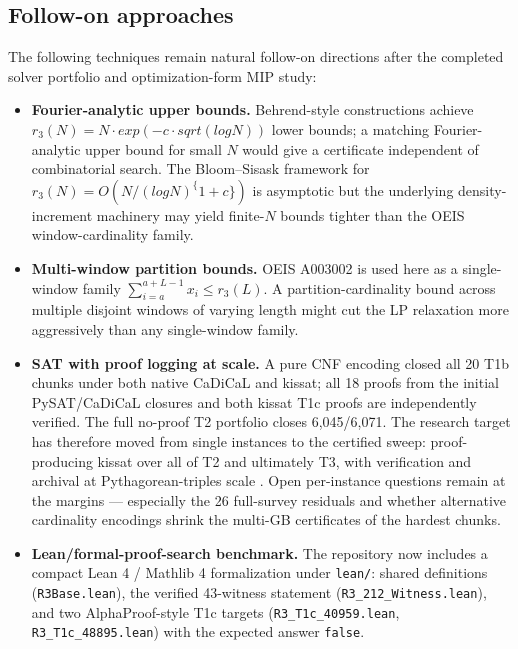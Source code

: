 \subsection{Follow-on approaches}\label{approaches-we-could-not-test}

The following techniques remain natural follow-on directions after the
completed solver portfolio and optimization-form MIP study:

\begin{itemize}
\tightlist
\item
  \textbf{Fourier-analytic upper bounds.} Behrend-style constructions
  achieve $r_3(N) = N · exp(-c·sqrt(log N))$ lower bounds; a
  matching Fourier-analytic upper bound for small $N$ would give a
  certificate independent of combinatorial search. The Bloom--Sisask
  framework for $r_3(N) = O(N / (log N)^\{1+c\})$ is asymptotic but
  the underlying density-increment machinery may yield finite-$N$
  bounds tighter than the OEIS window-cardinality family.
\item
  \textbf{Multi-window partition bounds.} OEIS A003002 is used here as
  a single-window family $\sum_{i=a}^{a+L-1}x_i\leq r_3(L)$. A
  partition-cardinality bound across multiple disjoint windows of
  varying length might cut the LP relaxation more aggressively
  than any single-window family.
\item
  \textbf{SAT with proof logging at scale.} A pure CNF encoding closed
  all 20 T1b chunks under both native CaDiCaL and kissat; all 18 proofs
  from the initial PySAT/CaDiCaL closures and both kissat T1c proofs are
  independently verified. The full no-proof T2 portfolio closes 6,045/6,071. The
  research target has therefore moved from single instances to the
  certified sweep: proof-producing kissat over all of T2 and ultimately
  T3, with verification and archival at Pythagorean-triples scale
  \cite{heule-kullmann-marek-2016}. Open per-instance questions remain
  at the margins --- especially the 26 full-survey residuals and whether
  alternative cardinality encodings shrink the multi-GB certificates of
  the hardest chunks.
\item
  \textbf{Lean/formal-proof-search benchmark.} The repository now includes a compact
  Lean 4 / Mathlib 4 formalization \cite{lean4-2021,mathlib4} under \texttt{lean/}: shared definitions
  (\texttt{R3Base.lean}), the verified 43-witness statement
  (\texttt{R3\_212\_Witness.lean}), and two AlphaProof-style T1c targets
  (\texttt{R3\_T1c\_40959.lean}, \texttt{R3\_T1c\_48895.lean}) with the expected answer \texttt{false}.

\end{itemize}
